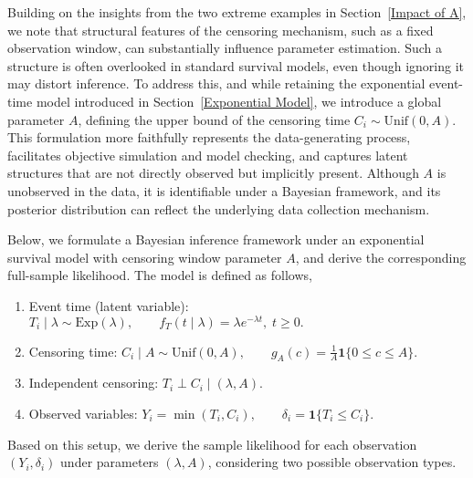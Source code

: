 Building on the insights from the two extreme examples in Section~\ref{Impact of A}, we note that structural features of the censoring mechanism, such as a fixed observation window, can substantially influence parameter estimation. Such a structure is often overlooked in standard survival models, even though ignoring it may distort inference. To address this, and while retaining the exponential event-time model introduced in Section~\ref{Exponential Model}, we introduce a global parameter $A$, defining the upper bound of the censoring time $C_i \sim \mathrm{Unif}(0, A)$. This formulation more faithfully represents the data-generating process, facilitates objective simulation and model checking, and captures latent structures that are not directly observed but implicitly present. Although $A$ is unobserved in the data, it is identifiable under a Bayesian framework, and its posterior distribution can reflect the underlying data collection mechanism.

Below, we formulate a Bayesian inference framework under an exponential survival model with censoring window parameter $A$, and derive the corresponding full-sample likelihood. The model is defined as follows,
\begin{enumerate}
    \item Event time (latent variable): $
    T_i \mid \lambda \sim \mathrm{Exp}(\lambda), 
    \qquad f_T(t \mid \lambda)=\lambda e^{-\lambda t},\; t\ge0.
    $
   \item Censoring time: $
   C_i \mid A \sim \mathrm{Unif}(0,A), 
   \qquad g_A(c)=\tfrac1A \mathbf 1\{0\le c\le A\}.
   $
   \item Independent censoring: $T_i \perp C_i \mid (\lambda, A).$
   \item Observed variables: $ Y_i=\min(T_i,C_i), \qquad 
   \delta_i=\mathbf 1\{T_i\le C_i\}.
   $
\end{enumerate}
Based on this setup, we derive the sample likelihood for each observation $(Y_i, \delta_i)$ under parameters $(\lambda, A)$, considering two possible observation types.

